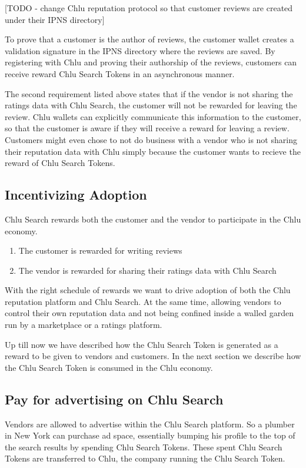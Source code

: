 \documentclass[a4paper]{article}
\begin{document}
[TODO - change Chlu reputation protocol so that customer reviews are
  created under their IPNS directory]

To prove that a customer is the author of reviews, the customer wallet
creates a validation signature in the IPNS directory where the reviews
are saved. By registering with Chlu and proving their authorship of
the reviews, customers can receive reward Chlu Search Tokens in an
asynchronous manner.

The second requirement listed above states that if the vendor is not
sharing the ratings data with Chlu Search, the customer will not be
rewarded for leaving the review. Chlu wallets can explicitly
communicate this information to the customer, so that the customer is
aware if they will receive a reward for leaving a review. Customers
might even chose to not do business with a vendor who is not sharing
their reputation data with Chlu simply because the customer wants to
recieve the reward of Chlu Search Tokens.

\subsection{Incentivizing Adoption}

Chlu Search rewards both the customer and the vendor to participate in
the Chlu economy.

\begin{enumerate}
\item The customer is rewarded for writing reviews
\item The vendor is rewarded for sharing their ratings data with Chlu
  Search
\end{enumerate}

With the right schedule of rewards we want to drive adoption of both
the Chlu reputation platform and Chlu Search. At the same time,
allowing vendors to control their own reputation data and not being
confined inside a walled garden run by a marketplace or a ratings
platform.

Up till now we have described how the Chlu Search Token is generated
as a reward to be given to vendors and customers. In the next section
we describe how the Chlu Search Token is consumed in the Chlu economy.

\subsection{Pay for advertising on Chlu Search}

Vendors are allowed to advertise within the Chlu Search platform. So a
plumber in New York can purchase ad space, essentially bumping his
profile to the top of the search results by spending Chlu Search
Tokens. These spent Chlu Search Tokens are transferred to Chlu, the
company running the Chlu Search Token.
\end{document}
